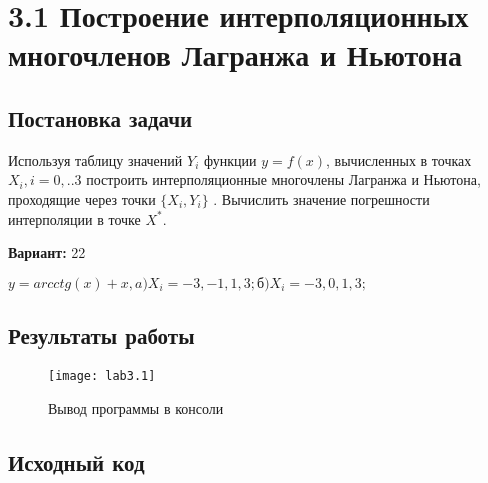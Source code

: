 \section* {3.1  Построение интерполяционных многочленов Лагранжа и Ньютона}

\subsection{Постановка задачи}
Используя таблицу значений $Y_i$ функции $y=f(x)$, вычисленных в точках $X_i, i=0,..3$ построить интерполяционные многочлены Лагранжа и Ньютона, проходящие через точки $\{X_i,Y_i \}$ . Вычислить значение погрешности интерполяции в точке $X^*$. 
 

{\bfseries Вариант:} 22

$y=arcctg(x)+x, a)X_i= -3,-1,1,3; б)X_i= -3,0,1,3;$

\subsection{Результаты работы}
\begin{figure}[h!]
\centering
\texttt{[image: lab3.1]}
\caption{Вывод программы в консоли}
\end{figure}


\pagebreak

\subsection{Исходный код}
% 



% 
% 
% 